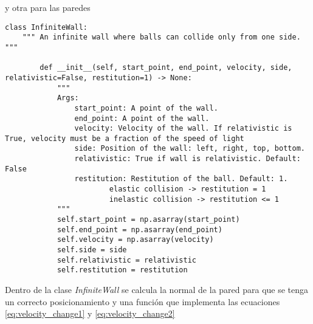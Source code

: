 y otra para las paredes

\begin{lstlisting}[breaklines]
    class InfiniteWall:
    """ An infinite wall where balls can collide only from one side. """

        def __init__(self, start_point, end_point, velocity, side, relativistic=False, restitution=1) -> None:
            """
            Args:
                start_point: A point of the wall.
                end_point: A point of the wall.
                velocity: Velocity of the wall. If relativistic is True, velocity must be a fraction of the speed of light
                side: Position of the wall: left, right, top, bottom.
                relativistic: True if wall is relativistic. Default: False
                restitution: Restitution of the ball. Default: 1.
                        elastic collision -> restitution = 1
                        inelastic collision -> restitution <= 1
            """
            self.start_point = np.asarray(start_point)
            self.end_point = np.asarray(end_point)
            self.velocity = np.asarray(velocity)
            self.side = side
            self.relativistic = relativistic
            self.restitution = restitution
    \end{lstlisting}

\vspace{3mm}

Dentro de la clase \textit{InfiniteWall} se calcula la normal de la pared para que se tenga un correcto posicionamiento y una función que implementa las ecuaciones \ref{eq:velocity_change1} y \ref{eq:velocity_change2} 

